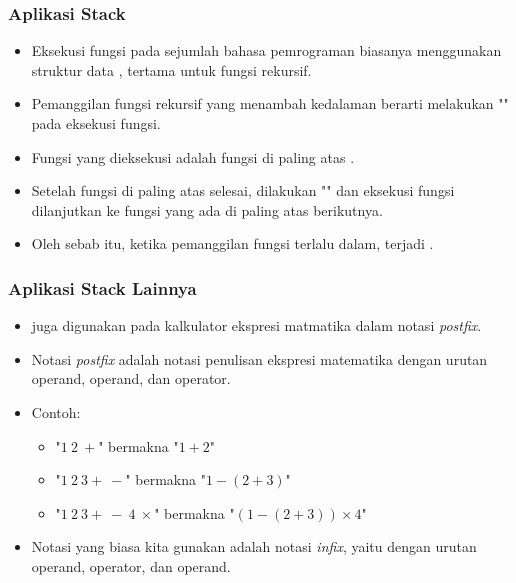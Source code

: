 \begin{frame}
\frametitle{Aplikasi Stack}
\begin{itemize}
  \item Eksekusi fungsi pada sejumlah bahasa pemrograman biasanya menggunakan struktur data , tertama untuk fungsi rekursif.
  \item Pemanggilan fungsi rekursif yang menambah kedalaman berarti melakukan "" pada  eksekusi fungsi.
  \item Fungsi yang dieksekusi adalah fungsi di paling atas .
  \item Setelah fungsi di paling atas selesai, dilakukan "" dan eksekusi fungsi dilanjutkan ke fungsi yang ada di paling atas  berikutnya.
  \item Oleh sebab itu, ketika pemanggilan fungsi terlalu dalam, terjadi .
\end{itemize}
\end{frame}

\begin{frame}
\frametitle{Aplikasi Stack Lainnya}
\begin{itemize}
  \item {} juga digunakan pada kalkulator ekspresi matmatika dalam notasi \textit{postfix}.
  \item Notasi \textit{postfix} adalah notasi penulisan ekspresi  matematika dengan urutan operand, operand, dan operator.
  \item Contoh:
  \begin{itemize}
    \item "$1 \ 2 \ +$" bermakna "$1 + 2$"
    \item "$1 \ 2 \ 3 + \ -$" bermakna "$1 - (2 + 3)$"
    \item "$1 \ 2 \ 3 + \ - \ 4 \ \times$" bermakna "$(1 - (2 + 3)) \times 4$"
  \end{itemize}
  \item Notasi yang biasa kita gunakan adalah notasi \textit{infix}, yaitu dengan urutan operand, operator, dan operand.
\end{itemize}
\end{frame}

